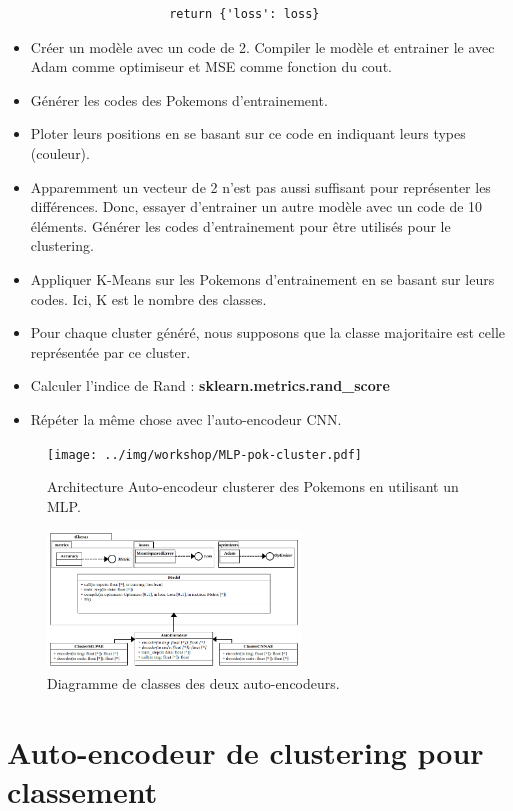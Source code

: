 \documentclass[11pt, a4paper]{article}
\begin{document}
\begin{itemize}
\begin{itemize}
\begin{verbatim}
			    return {'loss': loss}
		\end{verbatim}
	\end{itemize}
	\item Créer un modèle avec un code de 2. 
	Compiler le modèle et entrainer le avec Adam comme optimiseur et MSE comme fonction du cout.
	\item Générer les codes des Pokemons d'entrainement.
	\item Ploter leurs positions en se basant sur ce code en indiquant leurs types (couleur).
	\item Apparemment un vecteur de 2 n'est pas aussi suffisant pour représenter les différences. 
	Donc, essayer d'entrainer un autre modèle avec un code de 10 éléments. Générer les codes d'entrainement pour être utilis\'es pour le clustering.
	\item Appliquer K-Means sur les Pokemons d'entrainement en se basant sur leurs codes. 
	Ici, K est le nombre des classes.
	\item Pour chaque cluster généré, nous supposons que la classe majoritaire est celle représentée par ce cluster.
	\item Calculer l'indice de Rand : \textbf{sklearn.metrics.rand\_score}
	\item Répéter la même chose avec l'auto-encodeur CNN.
\end{itemize}

\begin{figure}[htp]
	\centering
	\texttt{[image: ../img/workshop/MLP-pok-cluster.pdf]}
	\caption{Architecture Auto-encodeur clusterer des Pokemons en utilisant un MLP.}
	\label{fig:MLP-pok-cluster}
\end{figure}

\begin{figure}[htp]
	\centering
	\includegraphics[width=0.6\textwidth]{../img/workshop/pok-cluster-classD.png}
	\caption{Diagramme de classes des deux auto-encodeurs.}
	\label{fig:pok-cluster-CD}
\end{figure}


\section{Auto-encodeur de clustering pour classement}
\end{document}
